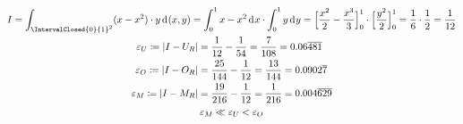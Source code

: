 \documentclass[../full]{subfiles}
\newcommand\DecimalPeriod[1]{\overline{#1}}
\newcommand\ErrorVar[1][]{\varepsilon_{#1}}
\begin{document}

    \begin{gather*}
        I = \int_{\IntervalClosed{0}{1}^2}
                \paren{x - x^2} \cdot y \dx[\paren{x, y}]
        = \int_0^1 x - x^2 \dx \cdot \int_0^1 y \dx[y]
        = \FunctionBounds{\frac{x^2}{2} - \frac{x^3}{3}}{0}{1}
            \cdot \FunctionBounds{\frac{y^2}{2}}{0}{1}
        = \frac{1}{6} \cdot \frac{1}{2}
        = \frac{1}{12}
        \\
        \begin{aligned}
            \ErrorVar[U] \coloneqq \abs{I - U_R} &
            = \frac{1}{12} - \frac{1}{54} = \frac{7}{108}
            = 0.06 \DecimalPeriod{481}
            \\
            \ErrorVar[O] \coloneqq \abs{I - O_R} &
            = \frac{25}{144} - \frac{1}{12} = \frac{13}{144}
            = 0.0902 \DecimalPeriod{7}
            \\
            \ErrorVar[M] \coloneqq \abs{I - M_R} &
            = \frac{19}{216} - \frac{1}{12} = \frac{1}{216}
            = 0.004 \DecimalPeriod{629}
        \end{aligned}
        \\
        \ErrorVar[M] \ll \ErrorVar[U] < \ErrorVar[O]
    \end{gather*}
\end{document}
